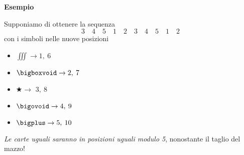 \documentclass[8pt]{beamer}
\theoremstyle{plain}
\theoremstyle{definition}
\begin{document}
\begin{frame}
\begin{center}
\textbf{Esempio} 

\medskip
\medskip

Supponiamo di ottenere la sequenza $$3\quad 4\quad 5\quad 1\quad 2\quad 3\quad 4\quad 5\quad 1\quad 2$$ con i simboli nelle nuove posizioni

\bigskip

\begin{itemize}
\item[]  \begin{center} $\iiint \rightarrow 1,\:6 $ \end{center}
\item[]  \begin{center} $\bigboxvoid \rightarrow 2,\:7 $ \end{center}
\item[]  \begin{center} $\bigstar \rightarrow$ $3,\:8 $ \end{center}
\item[]  \begin{center} $\bigovoid \rightarrow 4,\:9 $ \end{center}
\item[]  \begin{center} $\bigplus \rightarrow 5,\:10 $ \end{center}
\end{itemize}

\bigskip

\emph{Le carte uguali saranno in posizioni uguali modulo 5}, nonostante il taglio del mazzo!
% 
% 
\end{center}
\end{frame}
\end{document}
